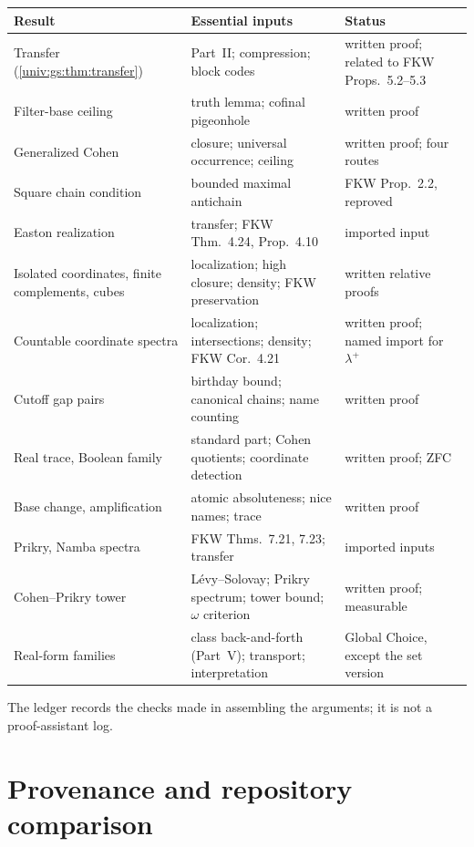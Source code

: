 \documentclass[11pt,letterpaper]{article}
\numberwithin{equation}{section}
\theoremstyle{definition}
\theoremstyle{remark}
\begin{document}
{\small
\begin{longtable}{@{}P{0.27\textwidth}P{0.4\textwidth}P{0.25\textwidth}@{}}
\toprule
Result & Essential inputs & Status\\
\midrule
\endhead
Transfer (\cref{univ:gs:thm:transfer}) & Part~II; compression; block codes & written proof; related to FKW Props.~5.2--5.3\\[3pt]
Filter-base ceiling & truth lemma; cofinal pigeonhole & written proof\\[3pt]
Generalized Cohen & closure; universal occurrence; ceiling & written proof; four routes\\[3pt]
Square chain condition & bounded maximal antichain & FKW Prop.~2.2, reproved\\[3pt]
Easton realization & transfer; FKW Thm.~4.24, Prop.~4.10 & imported input\\[3pt]
Isolated coordinates, finite complements, cubes & localization; high closure; density; FKW preservation & written relative proofs\\[3pt]
Countable coordinate spectra & localization; intersections; density; FKW Cor.~4.21 & written proof; named import for $\lambda^+$\\[3pt]
Cutoff gap pairs & birthday bound; canonical chains; name counting & written proof\\[3pt]
Real trace, Boolean family & standard part; Cohen quotients; coordinate detection & written proof; ZFC\\[3pt]
Base change, amplification & atomic absoluteness; nice names; trace & written proof\\[3pt]
Prikry, Namba spectra & FKW Thms.~7.21, 7.23; transfer & imported inputs\\[3pt]
Cohen--Prikry tower & Lévy--Solovay; Prikry spectrum; tower bound; $\omega$ criterion & written proof; measurable\\[3pt]
Real-form families & class back-and-forth (Part~V); transport; interpretation & Global Choice, except the set version\\
\bottomrule
\end{longtable}}

\noindent The ledger records the checks made in assembling the arguments; it is not a
proof-assistant log.

\appendix
\section{Provenance and repository comparison}\label{univ:app:audit}
\end{document}
